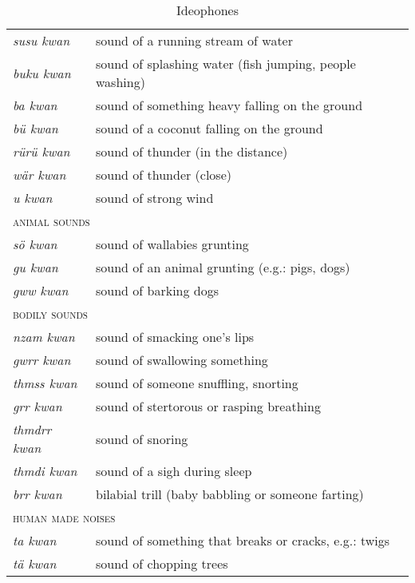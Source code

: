 {\renewcommand{\tabcolsep}{4pt}
\begin{table}
	\caption{Ideophones}
	\label{kwan-words}%
	\begin{tabularx}{\textwidth}{Xl}
		\lsptoprule
		\multicolumn{2}{l}{\textsc{sounds from nature}}\\ \midrule
		\emph{susu kwan}&sound of a running stream of water\\
		\emph{buku kwan}&sound of splashing water (fish jumping, people washing)\\
		\emph{ba kwan}&sound of something heavy falling on the ground\\
		\emph{bü kwan}&sound of a coconut falling on the ground\\
		\emph{rürü kwan}&sound of thunder (in the distance)\\
		\emph{wär kwan}&sound of thunder (close)\\
		\emph{u kwan}&sound of strong wind\\
		\multicolumn{2}{l}{\textsc{animal sounds}}\\ \midrule
		\emph{sö kwan}&sound of wallabies grunting\\
		\emph{gu kwan}&sound of an animal grunting (e.g.: pigs, dogs)\\
		\emph{gww kwan}&sound of barking dogs\\
		\multicolumn{2}{l}{\textsc{bodily sounds}}\\ \midrule
		\emph{nzam kwan}&sound of smacking one's lips\\
		\emph{gwrr kwan}&sound of swallowing something\\
		\emph{thmss kwan}&sound of someone snuffling, snorting\\
		\emph{grr kwan}&sound of stertorous or rasping breathing\\
		\emph{thmdrr kwan}&sound of snoring\\
		\emph{thmdi kwan}&sound of a sigh during sleep\\
		\emph{brr kwan}&bilabial trill (baby babbling or someone farting)\\
		\multicolumn{2}{l}{\textsc{human made noises}}\\ \midrule
		\emph{ta kwan}&sound of something that breaks or cracks, e.g.: twigs\\
		\emph{tä kwan}&sound of chopping trees\\

\end{tabularx}
\end{table}}
